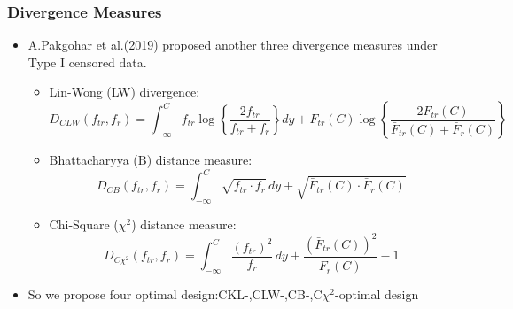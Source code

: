 \documentclass[xcolor=dvipsnames,aspectratio=1610]{beamer}
\begin{document}



\begin{frame}
\frametitle{Divergence Measures}
\begin{itemize}
\item A.Pakgohar et al.(2019) proposed another three divergence measures under Type I censored data.
\begin{itemize}
\item Lin-Wong (LW) divergence:
{\footnotesize
$$D_{CLW}(f_{tr}, f_r) = \int_{-\infty}^C f_{tr} \log \left\{ \frac{2f_{tr}}{f_{tr} + f_r} \right\} dy + \bar{F}_{tr}(C) \log \left\{ \frac{2\bar{F}_{tr}(C)}{ \bar{F}_{tr}(C) + \bar{F}_r(C)} \right\}$$
}
\item Bhattacharyya (B) distance measure:
{\footnotesize
$$D_{CB}(f_{tr}, f_r) = \int_{-\infty}^C \sqrt{f_{tr} \cdot f_r} \, dy + \sqrt{\bar{F}_{tr}(C) \cdot \bar{F}_r(C)}$$
}
\item Chi-Square ($\chi^2$) distance measure:
{\footnotesize
$$D_{C\chi^2}(f_{tr}, f_r) = \int_{-\infty}^C \frac{(f_{tr})^2}{f_r} \, dy + \frac{\left(\bar{F}_{tr}(C)\right)^2}{\bar{F}_r(C)} - 1$$
}
\end{itemize}
\item So we propose four optimal design:CKL-,CLW-,CB-,C$\chi^2$-optimal design
\end{itemize}


\end{frame}

\end{document}
